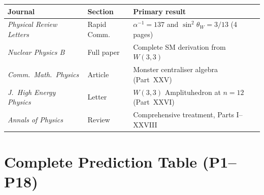 \begin{center}
\begin{tabular}{lll}
  \hline
  Journal & Section & Primary result \\
  \hline
  \emph{Physical Review Letters} & Rapid Comm. &
    $\alpha^{-1}=137$ and $\sin^2\theta_W=3/13$ (4 pages) \\
  \emph{Nuclear Physics B} & Full paper &
    Complete SM derivation from $W(3,3)$ \\
  \emph{Comm.~Math.~Physics} & Article &
    Monster centraliser algebra (Part~XXV) \\
  \emph{J.~High Energy Physics} & Letter &
    $W(3,3)$ Amplituhedron at $n=12$ (Part~XXVI) \\
  \emph{Annals of Physics} & Review &
    Comprehensive treatment, Parts I--XXVIII \\
  \hline
\end{tabular}
\end{center}

\section{Complete Prediction Table (P1--P18)}
\label{sec:full_predictions}

